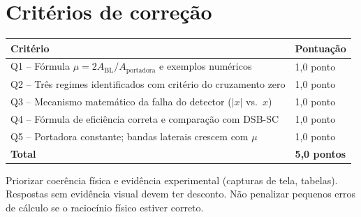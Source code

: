 \documentclass[11pt,a4paper]{article}
\begin{document}
\section*{Critérios de correção}
\begin{tabular}{ll}
  \toprule
  Critério & Pontuação \\
  \midrule
  Q1 -- Fórmula $\mu = 2A_\text{BL}/A_\text{portadora}$ e exemplos numéricos & 1,0 ponto \\
  Q2 -- Três regimes identificados com critério do cruzamento zero             & 1,0 ponto \\
  Q3 -- Mecanismo matemático da falha do detector ($|x|$ vs.\ $x$)            & 1,0 ponto \\
  Q4 -- Fórmula de eficiência correta e comparação com DSB-SC                 & 1,0 ponto \\
  Q5 -- Portadora constante; bandas laterais crescem com $\mu$                & 1,0 ponto \\
  \midrule
  \textbf{Total} & \textbf{5,0 pontos} \\
  \bottomrule
\end{tabular}

\bigskip
\begin{nota}
  Priorizar coerência física e evidência experimental (capturas de tela, tabelas).
  Respostas sem evidência visual devem ter desconto. Não penalizar pequenos erros
  de cálculo se o raciocínio físico estiver correto.
\end{nota}
\end{document}
